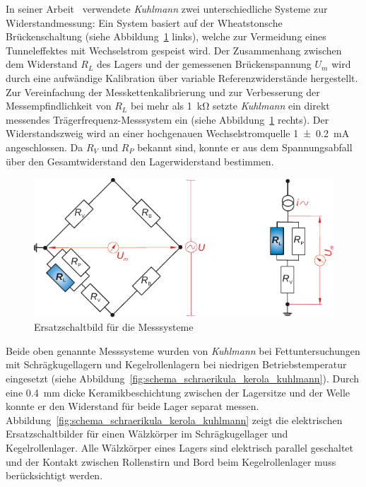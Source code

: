 In seiner Arbeit~\cite{kuhlmann_2009} verwendete \textit{Kuhlmann} zwei unterschiedliche Systeme zur Widerstandmessung:
Ein System basiert auf der Wheatstonsche Brückenschaltung (siehe Abbildung~\ref{fig:ersatzschaltbild_messsysteme_kuhlmann} links), welche zur Vermeidung eines Tunneleffektes mit Wechselstrom gespeist wird.
Der Zusammenhang zwischen dem Widerstand $R_L$ des Lagers und der gemessenen Brückenspannung $U_m$ wird durch eine aufwändige Kalibration über variable Referenzwiderstände hergestellt.
Zur Vereinfachung der Messkettenkalibrierung und zur Verbesserung der Messempfindlichkeit von $R_L$ bei mehr als \SI{1}{\kilo\ohm} setzte \textit{Kuhlmann} ein direkt messendes Trägerfrequenz-Messsystem ein (siehe Abbildung~\ref{fig:ersatzschaltbild_messsysteme_kuhlmann} rechts).
Der Widerstandszweig wird an einer hochgenauen Wechselstromquelle \SI[separate-uncertainty]{1 +- 0.2}{\milli\ampere} angeschlossen.
Da $R_V$ und $R_P$ bekannt sind, konnte er aus dem Spannungsabfall über den Gesamtwiderstand den Lagerwiderstand bestimmen.

\begin{figure}[htb]
    \centering
    \includegraphics[]{./images/ersatzschaltbild_kuhlmann.pdf}
    \caption{Ersatzschaltbild für die Messsysteme~\cite{kuhlmann_2009}}
    \label{fig:ersatzschaltbild_messsysteme_kuhlmann}
\end{figure}

Beide oben genannte Messsysteme wurden von \textit{Kuhlmann} bei Fettuntersuchungen mit Schrägkugellagern und Kegelrollenlagern bei niedrigen Betriebstemperatur eingesetzt (siehe Abbildung~\ref{fig:schema_schraerikula_kerola_kuhlmann}).
Durch eine \SI{0.4}{\milli\meter} dicke Keramikbeschichtung zwischen der Lagersitze und der Welle konnte er den Widerstand für beide Lager separat messen.
Abbildung~\ref{fig:schema_schraerikula_kerola_kuhlmann} zeigt die elektrischen Ersatzschaltbilder für einen Wälzkörper im Schrägkugellager und Kegelrollenlager.
Alle Wälzkörper eines Lagers sind elektrisch parallel geschaltet und der Kontakt zwischen Rollenstirn und Bord beim Kegelrollenlager muss berücksichtigt werden.

